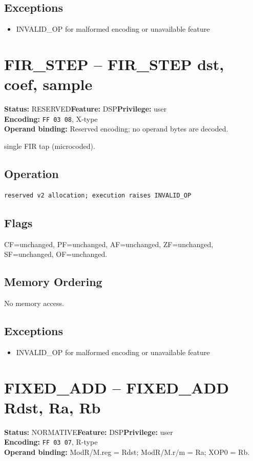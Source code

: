 \documentclass[10pt]{article}
\begin{document}
\subsection*{Exceptions}
\begin{itemize}
\item INVALID\_OP for malformed encoding or unavailable feature
\end{itemize}
\clearpage

\section{FIR\_STEP -- FIR\_STEP dst, coef, sample}
\textbf{Status:} RESERVED\quad \textbf{Feature:} DSP\quad \textbf{Privilege:} user\\
\textbf{Encoding:} \texttt{FF 03 08}, X-type\\
\textbf{Operand binding:} Reserved encoding; no operand bytes are decoded.

single FIR tap (microcoded).

\subsection*{Operation}
\begin{lstlisting}
reserved v2 allocation; execution raises INVALID_OP
\end{lstlisting}
\subsection*{Flags}
CF=unchanged, PF=unchanged, AF=unchanged, ZF=unchanged, SF=unchanged, OF=unchanged.
\subsection*{Memory Ordering}
No memory access.
\subsection*{Exceptions}
\begin{itemize}
\item INVALID\_OP for malformed encoding or unavailable feature
\end{itemize}
\clearpage

\section{FIXED\_ADD -- FIXED\_ADD Rdst, Ra, Rb}
\textbf{Status:} NORMATIVE\quad \textbf{Feature:} DSP\quad \textbf{Privilege:} user\\
\textbf{Encoding:} \texttt{FF 03 07}, R-type\\
\textbf{Operand binding:} ModR/M.reg = Rdst; ModR/M.r/m = Ra; XOP0 = Rb.
\end{document}
